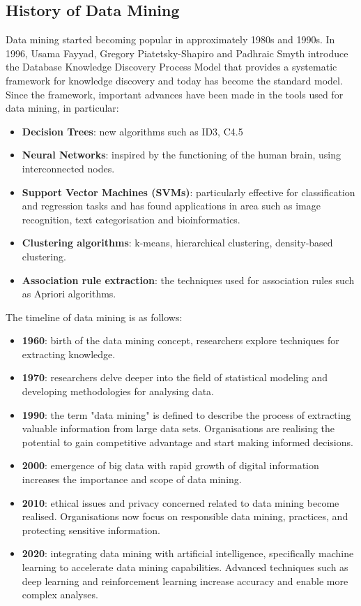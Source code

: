 \documentclass[a4paper, 12pt]{article}
\theoremstyle{plain}
\theoremstyle{definition}
\theoremstyle{remark}
\begin{document}
\subsection{History of Data Mining}
Data mining started becoming popular in approximately 1980s and 1990s. In 1996, Usama Fayyad, Gregory Piatetsky-Shapiro and Padhraic Smyth introduce the Database Knowledge Discovery Process Model that provides a systematic framework for knowledge discovery and today has become the standard model. Since the framework, important advances have been made in the tools used for data mining, in particular:
\begin{itemize}
	\item \textbf{Decision Trees}: new algorithms such as ID3, C4.5
	\item \textbf{Neural Networks}: inspired by the functioning of the human brain, using interconnected nodes.
	\item \textbf{Support Vector Machines (SVMs)}: particularly effective for classification and regression tasks and has found applications in area such as image recognition, text categorisation and bioinformatics.
	\item \textbf{Clustering algorithms}: k-means, hierarchical clustering, density-based clustering.
	\item \textbf{Association rule extraction}: the techniques used for association rules such as Apriori algorithms.
\end{itemize}
The timeline of data mining is as follows:
\begin{itemize}
	\item \textbf{1960}: birth of the data mining concept, researchers explore techniques for extracting knowledge.
	\item \textbf{1970}: researchers delve deeper into the field of statistical modeling and developing methodologies for analysing data.
	\item \textbf{1990}: the term "data mining" is defined to describe the process of extracting valuable information from large data sets. Organisations are realising the potential to gain competitive advantage and start making informed decisions.
	\item \textbf{2000}: emergence of big data with rapid growth of digital information increases the importance and scope of data mining.
	\item \textbf{2010}: ethical issues and privacy concerned related to data mining become realised. Organisations now focus on responsible data mining, practices, and protecting sensitive information.
	\item \textbf{2020}: integrating data mining with artificial intelligence, specifically machine learning to accelerate data mining capabilities. Advanced techniques such as deep learning and reinforcement learning increase accuracy and enable more complex analyses.
\end{itemize}
\end{document}
